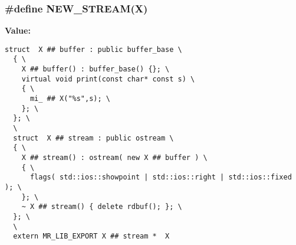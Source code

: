 \subsubsection{\setlength{\rightskip}{0pt plus 5cm}\#define NEW\_\-STREAM(X)}\label{mrStream_8h_a0}


{\bf Value:}

\footnotesize\begin{verbatim}struct  X ## buffer : public buffer_base \
  { \
    X ## buffer() : buffer_base() {}; \
    virtual void print(const char* const s) \
    { \
      mi_ ## X("%s",s); \
    }; \
  }; \
  \
  struct  X ## stream : public ostream \
  { \
    X ## stream() : ostream( new X ## buffer ) \
    { \
      flags( std::ios::showpoint | std::ios::right | std::ios::fixed ); \
    }; \
    ~ X ## stream() { delete rdbuf(); }; \
  }; \
  \
  extern MR_LIB_EXPORT X ## stream *  X
\end{verbatim}\normalsize 
